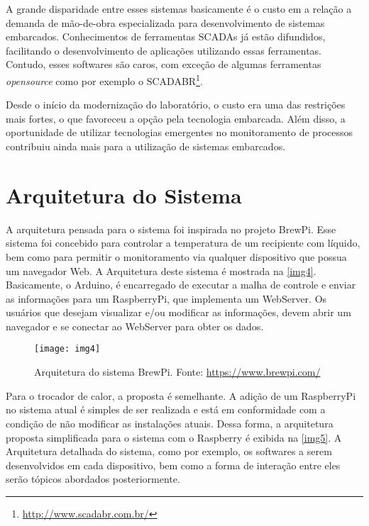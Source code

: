 		A grande disparidade entre esses sistemas basicamente é o custo em a relação a demanda de mão-de-obra especializada para desenvolvimento de sistemas embarcados. Conhecimentos de ferramentas SCADAs já estão difundidos, facilitando o desenvolvimento de aplicações utilizando essas ferramentas. Contudo, esses softwares são caros, com exceção de algumas ferramentas \textit{opensource} como por exemplo o SCADABR\footnote{\url{http://www.scadabr.com.br/}}.
		
		Desde o início da modernização do laboratório, o custo era uma das restrições mais fortes, o que favoreceu a opção pela tecnologia embarcada. Além disso, a oportunidade de utilizar tecnologias emergentes no monitoramento de processos contribuiu ainda mais para a utilização de sistemas embarcados.
		
	\section{Arquitetura do Sistema}
		A arquitetura pensada para o sistema foi inspirada no projeto BrewPi. Esse sistema foi concebido para controlar a temperatura de um recipiente com líquido, bem como para permitir o monitoramento via qualquer dispositivo que possua um navegador Web. A Arquitetura deste sistema é mostrada na \autoref{img4}. Basicamente, o Arduino, é encarregado de executar a malha de controle e enviar as informações para um RaspberryPi, que implementa um WebServer. Os usuários que desejam visualizar e/ou modificar as informações, devem abrir um navegador e se conectar ao WebServer para obter os dados.
		
		\begin{figure}[!htb]	
			\captionsetup{justification=centering}
			\begin{center}
				\texttt{[image: img4]}  %
				\caption[Arquitetura do sistema BrewPi]{\label{img4}Arquitetura do sistema BrewPi. Fonte: \url{https://www.brewpi.com/} }
			\end{center}		
		\end{figure}
	
		Para o trocador de calor, a proposta é semelhante. A adição de um RaspberryPi no sistema atual é simples de ser realizada e está em conformidade com a condição de não modificar as instalações atuais. Dessa forma, a arquitetura proposta simplificada para o sistema com o Raspberry é exibida na \autoref{img5}. A Arquitetura detalhada do sistema, como por exemplo, os softwares a serem desenvolvidos em cada dispositivo, bem como a forma de interação entre eles serão tópicos abordados posteriormente.
		
